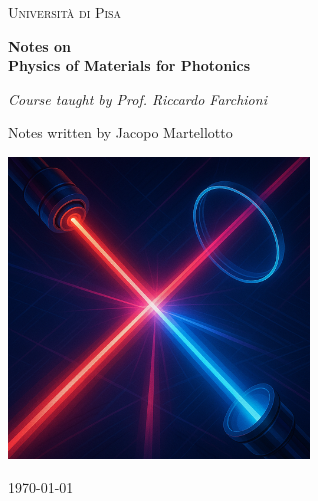 \documentclass[11pt,a4paper]{book}
\begin{document}
\begin{titlepage}
    \centering
    \vspace*{2cm}
    
    {\scshape\LARGE Università di Pisa \par}
    \vspace{1.5cm}
    {\Huge\bfseries Notes on \\[0.5cm]
    Physics of Materials for Photonics\par}
    \vspace{2cm}
    {\Large\itshape Course taught by Prof. Riccardo Farchioni\par}
    \vfill
    {\large Notes written by Jacopo Martellotto\par}
    \vspace{0.5cm}
    \begin{center}
    \includegraphics[width=0.6\textwidth]{img/cover.png}
    \vspace{1cm}
    \end{center}
    {\large \today\par}
\end{titlepage}

\tableofcontents
\newpage









\cleardoublepage
{}
{}


\end{document}
